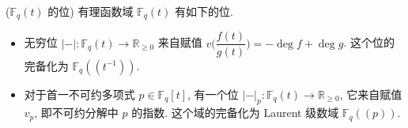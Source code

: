 \documentclass{book}
\begin{document}
	\begin{example}
		{($\mathbb F_q(t)$ 的位)}
		有理函数域 $\mathbb F_q(t)$ 有如下的位.
		\begin{itemize}
			\item 无穷位 $|{-}| \colon \mathbb F_q(t) \to \mathbb R_{\geq 0}$ 来自赋值 $v\Big(\dfrac{f(t)}{g(t)}\Big)= - \deg f + \deg g$. 这个位的完备化为 $\mathbb F_q((t^{-1}))$.
			\item 对于首一不可约多项式 $p\in \mathbb F_q[t]$, 有一个位 $|{-}|_p\colon \mathbb F_q(t) \to \mathbb R_{\geq 0}$, 它来自赋值 $v_p$, 即不可约分解中 $p$ 的指数. 这个域的完备化为 Laurent 级数域 $\mathbb F_q((p))$.
		\end{itemize}
	\end{example}
	
	
	
	\printbibliography
	
\end{document}
